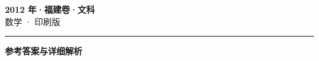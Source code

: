 \documentclass[zihao=5, a4paper]{ctexart}
\begin{document}
\begin{center}
  {\Large\bfseries 2012 年·福建卷·文科}\\[4pt]
  {\large 数学 · 印刷版}
\end{center}
\medskip
{}

\par\bigskip\hrule\bigskip
{}
\Needspace{0.55\textheight}
\begin{center}{\large\bfseries 参考答案与详细解析}\end{center}
\smallskip

\end{document}
